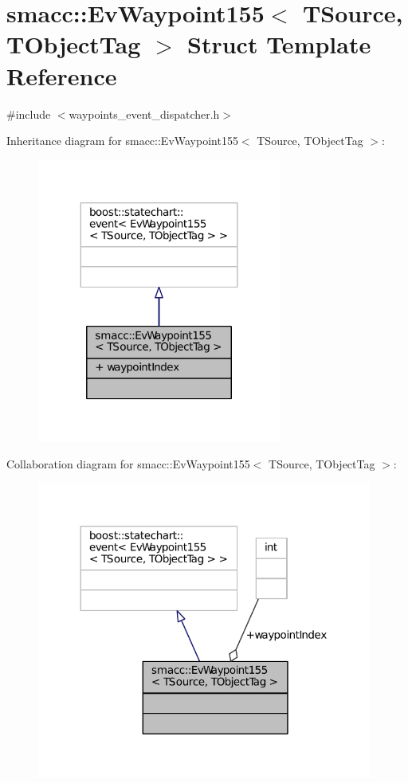 \hypertarget{structsmacc_1_1EvWaypoint155}{}\section{smacc\+:\+:Ev\+Waypoint155$<$ T\+Source, T\+Object\+Tag $>$ Struct Template Reference}
\label{structsmacc_1_1EvWaypoint155}


{\ttfamily \#include $<$waypoints\+\_\+event\+\_\+dispatcher.\+h$>$}



Inheritance diagram for smacc\+:\+:Ev\+Waypoint155$<$ T\+Source, T\+Object\+Tag $>$\+:
\nopagebreak
\begin{figure}[H]
\begin{center}
\leavevmode
\includegraphics[width=227pt]{structsmacc_1_1EvWaypoint155__inherit__graph}
\end{center}
\end{figure}


Collaboration diagram for smacc\+:\+:Ev\+Waypoint155$<$ T\+Source, T\+Object\+Tag $>$\+:
\nopagebreak
\begin{figure}[H]
\begin{center}
\leavevmode
\includegraphics[width=312pt]{structsmacc_1_1EvWaypoint155__coll__graph}
\end{center}
\end{figure}
